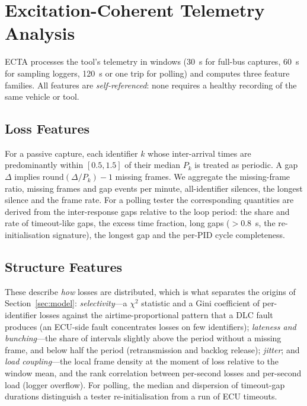 \section{Excitation-Coherent Telemetry Analysis}
\label{sec:method}

ECTA processes the tool's telemetry in windows (30~s for full-bus
captures, 60~s for sampling loggers, 120~s or one trip for polling) and
computes three feature families. All features are \emph{self-referenced}:
none requires a healthy recording of the same vehicle or tool.

\subsection{Loss Features}
For a passive capture, each identifier $k$ whose inter-arrival times are
predominantly within $[0.5,1.5]$ of their median $P_k$ is treated as
periodic. A gap $\Delta$ implies $\mathrm{round}(\Delta/P_k)-1$ missing
frames. We aggregate the missing-frame ratio, missing frames and gap events
per minute, all-identifier silences, the longest silence and the frame
rate. For a polling tester the corresponding quantities are derived from the
inter-response gaps relative to the loop period: the share and rate of
timeout-like gaps, the excess time fraction, long gaps ($>0.8$~s, the
re-initialisation signature), the longest gap and the per-PID cycle
completeness.

\subsection{Structure Features}
These describe \emph{how} losses are distributed, which is what separates
the origins of Section~\ref{sec:model}:
\emph{selectivity}---a $\chi^2$ statistic and a Gini coefficient of
per-identifier losses against the airtime-proportional pattern that a DLC
fault produces (an ECU-side fault concentrates losses on few identifiers);
\emph{lateness and bunching}---the share of intervals slightly above the
period without a missing frame, and below half the period (retransmission
and backlog release); \emph{jitter}; and \emph{load coupling}---the local
frame density at the moment of loss relative to the window mean, and the
rank correlation between per-second losses and per-second load (logger
overflow). For polling, the median and dispersion of timeout-gap durations
distinguish a tester re-initialisation from a run of ECU timeouts.

